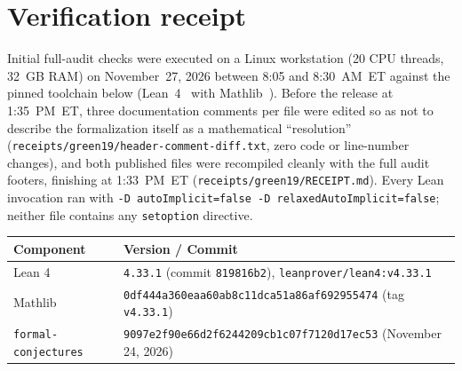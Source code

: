\documentclass[11pt,reqno]{amsart}
\theoremstyle{remark}
\newcommand{\LeanUS}{\textunderscore\hspace{0pt}}
\newcommand{\lean}[1]{{\let\_\LeanUS\texttt{#1}}}
\begin{document}
\section{Verification receipt}\label{sec:receipt}

Initial full-audit checks were executed on a Linux workstation (20 CPU threads, 32~GB RAM) on November~27, 2026 between 8:05 and 8:30~AM~ET against the pinned toolchain below (Lean~4~\cite{Lean4} with Mathlib~\cite{Mathlib}). Before the release at 1:35~PM~ET, three documentation comments per file were edited so as not to describe the formalization itself as a mathematical ``resolution'' (\lean{receipts/\allowbreak{}green19/\allowbreak{}header-comment-diff.\allowbreak{}txt}, zero code or line-number changes), and both published files were recompiled cleanly with the full audit footers, finishing at 1:33~PM~ET (\lean{receipts/\allowbreak{}green19/\allowbreak{}RECEIPT.\allowbreak{}md}). Every Lean invocation ran with \lean{-D autoImplicit=false -D relaxedAutoImplicit=false}; neither file contains any \lean{set\_option} directive.

\begin{center}
\small
\begin{tabular}{@{}ll@{}}
\toprule
Component & Version / Commit \\
\midrule
Lean 4 & \lean{4.33.1} (commit \lean{819816b2}), \lean{leanprover/\allowbreak{}lean4:v4.33.1} \\
Mathlib & \lean{0df444a360eaa60ab8c11dca51a86af692955474} (tag \lean{v4.33.1}) \\
\lean{formal-conjectures} & \lean{9097e2f90e66d2f6244209cb1c07f7120d17ec53} (November 24, 2026) \\
\bottomrule
\end{tabular}
\end{center}

\medskip
\end{document}

